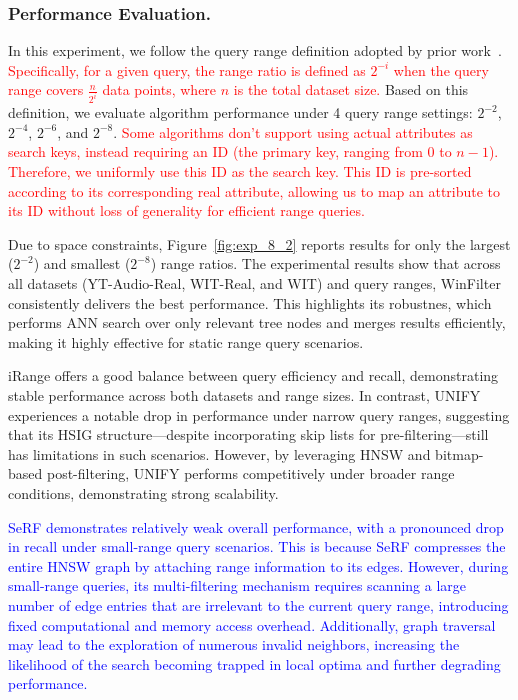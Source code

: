 \documentclass[sigconf, nonacm]{acmart}
\begin{document}
	
	\subsubsection{Performance Evaluation. }
	
	In this experiment, we follow the query range definition adopted by prior work~\cite{HQI}. \textcolor{red}{Specifically, for a given query, the range ratio is defined as $2^{-i}$	when the query range covers $\frac{n}{2^i}$ data points, where $n$ is the total dataset size.} Based on this definition, we evaluate algorithm performance under 4 query range settings: $2^{-2}$, $2^{-4}$, $2^{-6}$, and $2^{-8}$. \textcolor{red}{Some algorithms don't support using actual attributes as search keys, instead requiring an ID (the primary key, ranging from $0$ to $n-1$). Therefore, we uniformly use this ID as the search key. This ID is pre-sorted according to its corresponding real attribute, allowing us to map an attribute to its ID without loss of generality for efficient range queries.}
	
	Due to space constraints, Figure~\ref{fig:exp_8_2} reports results for only the largest ($2^{-2}$) and smallest ($2^{-8}$) range ratios. The experimental results show that across all datasets (YT-Audio-Real, WIT-Real, and WIT) and query ranges, WinFilter consistently delivers the best performance. This highlights its robustnes, which performs ANN search over only relevant tree nodes and merges results efficiently, making it highly effective for static range query scenarios.
	
	iRange offers a good balance between query efficiency and recall, demonstrating stable performance across both datasets and range sizes. In contrast, UNIFY experiences a notable drop in performance under narrow query ranges, suggesting that its HSIG structure—despite incorporating skip lists for pre-filtering—still has limitations in such scenarios. However, by leveraging HNSW and bitmap-based post-filtering, UNIFY performs competitively under broader range conditions, demonstrating strong scalability.
	

	\textcolor{blue}{SeRF demonstrates relatively weak overall performance, with a pronounced drop in recall under small-range query scenarios. This is because SeRF compresses the entire HNSW graph by attaching range information to its edges. However, during small-range queries, its multi-filtering mechanism requires scanning a large number of edge entries that are irrelevant to the current query range, introducing fixed computational and memory access overhead. Additionally, graph traversal may lead to the exploration of numerous invalid neighbors, increasing the likelihood of the search becoming trapped in local optima and further degrading performance.
	}
	
\end{document}
